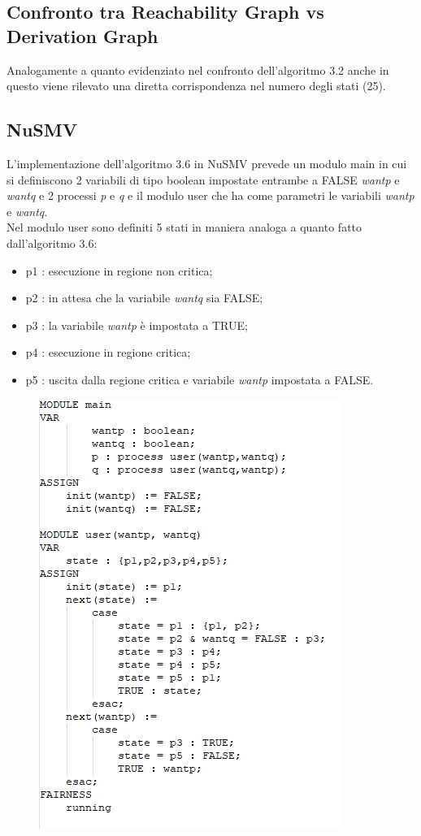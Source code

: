 \documentclass{article}
\begin{document}
\subsection{Confronto tra Reachability Graph vs Derivation Graph}
Analogamente a quanto evidenziato nel confronto dell'algoritmo 3.2 anche in questo viene rilevato una diretta corrispondenza nel numero degli stati (25).
\clearpage
\subsection{NuSMV}
L'implementazione dell'algoritmo 3.6 in NuSMV prevede un modulo main in cui si definiscono 2 variabili di tipo boolean impostate entrambe a FALSE \textit{wantp} e \textit{wantq} e 2 processi \textit{p} e \textit{q} e il modulo user che ha come parametri le variabili  \textit{wantp} e \textit{wantq}. 
\\Nel modulo user sono definiti 5 stati in maniera analoga a quanto fatto dall'algoritmo 3.6:
\begin{itemize}
    \item p1 : esecuzione in regione non critica;
    \item p2 : in attesa che la variabile \textit{wantq} sia FALSE;
    \item p3 : la variabile \textit{wantp} è impostata a TRUE;
    \item p4 : esecuzione in regione critica;
    \item p5 : uscita dalla regione critica e variabile \textit{wantp} impostata a FALSE.
\end{itemize}
\begin{figure}[h] 
\centering
\includegraphics[scale=1.2]{3.6nusmv.png}
\end{figure}
\end{document}
